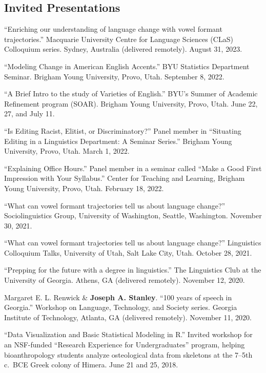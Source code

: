 \documentclass[
]{article}
\begin{document}
\hypertarget{invited-presentations}{%
\subsection{Invited Presentations}\label{invited-presentations}}

``Enriching our understanding of language change with vowel formant
trajectories.'' Macquarie University Centre for Language Sciences (CLaS)
Colloquium series. Sydney, Australia (delivered remotely). August 31,
2023.

``Modeling Change in American English Accents.'' BYU Statistics
Department Seminar. Brigham Young University, Provo, Utah. September 8,
2022.

``A Brief Intro to the study of Varieties of English.'' BYU's Summer of
Academic Refinement program (SOAR). Brigham Young University, Provo,
Utah. June 22, 27, and July 11.

``Is Editing Racist, Elitist, or Discriminatory?'' Panel member in
``Situating Editing in a Linguistics Department: A Seminar Series.''
Brigham Young University, Provo, Utah. March 1, 2022.

``Explaining Office Hours.'' Panel member in a seminar called ``Make a
Good First Impression with Your Syllabus.'' Center for Teaching and
Learning, Brigham Young University, Provo, Utah. February 18, 2022.

``What can vowel formant trajectories tell us about language change?''
Sociolinguistics Group, University of Washington, Seattle, Washington.
November 30, 2021.

``What can vowel formant trajectories tell us about language change?''
Linguistics Colloquium Talks, University of Utah, Salt Lake City, Utah.
October 28, 2021.

``Prepping for the future with a degree in linguistics.'' The
Linguistics Club at the University of Georgia. Athens, GA (delivered
remotely). November 12, 2020.

Margaret E. L. Renwick \& \textbf{Joseph A. Stanley}. ``100 years of
speech in Georgia.'' Workshop on Language, Technology, and Society
series. Georgia Institute of Technology, Atlanta, GA (delivered
remotely). November 11, 2020.

``Data Visualization and Basic Statistical Modeling in R.'' Invited
workshop for an NSF-funded ``Research Experience for Undergraduates''
program, helping bioanthropology students analyze osteological data from
skeletons at the 7--5th c.~BCE Greek colony of Himera. June 21 and 25,
2018.
\end{document}
